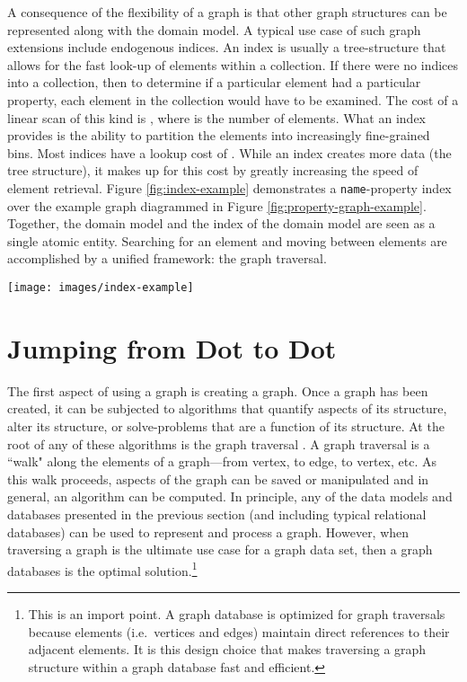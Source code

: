 \documentclass{svmult}
\newcommand{\ttt}{\texttt}
\begin{document}
A consequence of the flexibility of a graph is that other graph structures can be represented along with the domain model. A typical use case of such graph extensions include endogenous indices. An index is usually a tree-structure that allows for the fast look-up of elements within a collection. If there were no indices into a collection, then to determine if a particular element had a particular property, each element in the collection would have to be examined. The cost of a linear scan of this kind is , where  is the number of elements. What an index provides is the ability to partition the elements into increasingly fine-grained bins. Most indices have a lookup cost of . While an index creates more data (the tree structure), it makes up for this cost by greatly increasing the speed of element retrieval. Figure \ref{fig:index-example} demonstrates a \ttt{name}-property index over the example graph diagrammed in Figure \ref{fig:property-graph-example}. Together, the domain model and the index of the domain model are seen as a single atomic entity. Searching for an element and moving between elements are accomplished by a unified framework: the graph traversal.
\begin{figure*}[h!]
	\centering
		\texttt{[image: images/index-example]}
	\caption{\label{fig:index-example}The index of the attributes/properties of the vertices and edges tend to be trees. A graph is a generalization of a tree. As such, graph databases allow for the modeling of the indices of the graph within the graph structure itself. For the sake of diagram clarity, the index does not touch every vertex with a \ttt{name} property. Finally, the edge labels of the index tree denote the ``bin'' that each sub-vertex is representing.}
\end{figure*}

\section{Jumping from Dot to Dot}

The first aspect of using a graph is creating a graph. Once a graph has been created, it can be subjected to algorithms that quantify aspects of its structure, alter its structure, or solve-problems that are a function of its structure. At the root of any of these algorithms is the graph traversal \cite{traversal:rodriguez2010}. A graph traversal is a ``walk" along the elements of a graph---from vertex, to edge, to vertex, etc. As this walk proceeds, aspects of the graph can be saved or manipulated and in general, an algorithm can be computed. In principle, any of the data models and databases presented in the previous section (and including typical relational databases) can be used to represent and process a graph. However, when traversing a graph is the ultimate use case for a graph data set, then a graph databases is the optimal solution.\footnote{This is an import point. A graph database is optimized for graph traversals because elements (i.e.~vertices and edges) maintain direct references to their adjacent elements. It is this design choice that makes traversing a graph structure within a graph database fast and efficient.}
\end{document}
